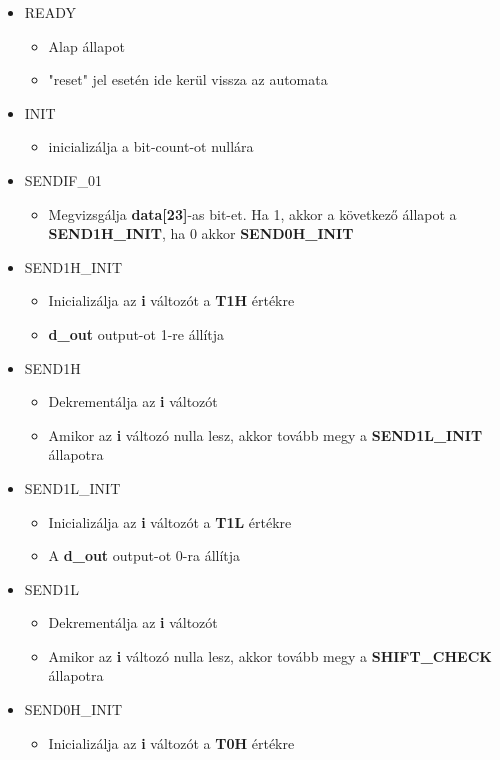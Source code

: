 \begin{itemize}
\item READY
	\begin{itemize}
	\item Alap állapot 
	\item "reset" jel esetén ide kerül vissza az automata
	\end{itemize}
\item INIT
	\begin{itemize}
	\item inicializálja a bit-count-ot nullára
	\end{itemize}
\item SENDIF\_01
	\begin{itemize}
	\item Megvizsgálja \textbf{data[23]}-as bit-et. Ha 1, akkor a következő állapot a \textbf{SEND1H\_INIT}, ha 0 akkor \textbf{SEND0H\_INIT}
	\end{itemize}
\item SEND1H\_INIT
	\begin{itemize}
	\item Inicializálja az \textbf{i} változót a \textbf{T1H} értékre
	\item \textbf{d\_out} output-ot 1-re állítja
	\end{itemize}
\item SEND1H
	\begin{itemize}
	\item Dekrementálja az \textbf{i} változót
	\item Amikor az \textbf{i} változó nulla lesz, akkor tovább megy a \textbf{SEND1L\_INIT} állapotra
	\end{itemize}
\item SEND1L\_INIT
	\begin{itemize}
	\item Inicializálja az \textbf{i} változót a \textbf{T1L} értékre
	\item A \textbf{d\_out} output-ot 0-ra állítja
	\end{itemize}
\item SEND1L
	\begin{itemize}
	\item Dekrementálja az \textbf{i} változót
	\item Amikor az \textbf{i} változó nulla lesz, akkor tovább megy a \textbf{SHIFT\_CHECK} állapotra
	\end{itemize}
\item SEND0H\_INIT
	\begin{itemize}
	\item Inicializálja az \textbf{i} változót a \textbf{T0H} értékre

\end{itemize}
\end{itemize}
